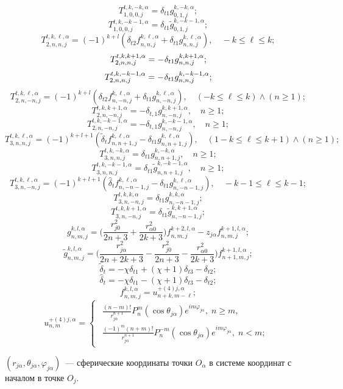 \begin{theorem}
\[T_{1,0,0,j}^{t,k, - k,\alpha } = {\delta _{t1}}{g}_{0,1,j}^{k, - k,\alpha };\]
\[T_{1,0,0,j}^{t,k, - k - 1,\alpha } = {\delta _{t1}}{\tilde g}_{0,1,j}^{k, - k - 1,\alpha };\]
\[T_{2,n,n,j}^{t,k,\ell ,\alpha } = (-1)^{k+l}({\delta _{t2}}{f}_{n,n,j}^{k,\ell ,\alpha } + {\delta _{t1}}{g}_{n,n,j}^{k,\ell ,\alpha }),\quad - k \le \ell  \le k;\]
\[T_{2,n,n,j}^{t,k,k+1,\alpha } =  - {\mkern 1mu} {\delta _{t1}}{g}_{n,n,j}^{k,k+1,\alpha };\]
\[T_{2,n,n,j}^{t,k, - k - 1,\alpha } =  - {\mkern 1mu} {\delta _{t1}}{g}_{n,n,j}^{k, - k - 1,\alpha };\]
\[T_{2,n, - n,j}^{t,k,\ell ,\alpha } = (-1)^{k+l}({\delta _{t2}}{f}_{n, - n,j}^{k,\ell ,\alpha } + {\delta _{t1}}{g}_{n, - n,j}^{k,\ell ,\alpha }),\quad (- k \le \ell  \le k) \wedge (n\ge 1);\]
\[T_{2,n, - n,j}^{t,k,k+1,\alpha } =  - {\delta _{t,1}}{g}_{n, - n,j}^{k,k + 1,\alpha },\quad n\ge 1;\]
\[T_{2,n, - n,j}^{t,k,-k-1,\alpha } =  - {\delta _{t,1}}{g}_{n, - n,j}^{k,-k-1,\alpha },\quad n\ge 1;\]
\[T_{3,n,n,j}^{t,k,\ell ,\alpha } = (-1)^{k+l+1}({\tilde \delta _t}{f}_{n,n + 1,j}^{k,\ell ,\alpha } - {\delta _{t1}}{g}_{n,n + 1,j}^{k,\ell ,\alpha }),\quad (1 - k \le \ell  \le k + 1) \wedge (n \ge 1);\]
\[T_{3,n,n,j}^{t,k, - k,\alpha } =  {\delta _{t1}}{g}_{n,n + 1,j}^{k, - k,\alpha },\quad n\ge 1;\]
\[T_{3,n,n,j}^{t,k, - k - 1,\alpha } = {\delta _{t1}}{\tilde g}_{n,n+1,j}^{k, - k - 1,\alpha },\quad n\ge 1;\]
\[T_{3,n, - n,j}^{t,k,\ell ,\alpha } = (-1)^{k+l+1}({\hat \delta _t}{f}_{n, - n - 1,j}^{k,\ell ,\alpha } - {\delta _{t1}}{g}_{n, - n - 1,j}^{k,\ell ,\alpha }),\quad - k - 1 \le \ell  \le k - 1;\]
\[T_{3,n, - n,j}^{t,k,k,\alpha } = {\delta _{t1}}{g}_{n, - n - 1,j}^{k,k,\alpha };\]
\[T_{3,n, - n,j}^{t,k,k + 1,\alpha } = {\delta _{t1}}{\tilde g}_{n,-n-1,j}^{k,k + 1,\alpha };\]
\[g_{n,m,j}^{k,l,\alpha}=\bigg(\frac{r_{j0}^2}{2n+3}+\frac{r_{\alpha 0}^2}{2k+3}\bigg)f_{n,m,j}^{k+2,l,\alpha}-z_{j\alpha}f_{n,m,j}^{k+1,l,\alpha};\]
\[{\tilde g}_{n,m,j}^{k,l,\alpha}=\bigg(\frac{r_{j\alpha}^2}{2n+2k+3}-\frac{r_{j0}^2}{2n+3}-\frac{r_{\alpha 0}^2}{2k+3}\bigg)f_{n+1,m,j}^{k+1,l,\alpha};\]
\[{\tilde \delta _t} =  - \chi {\delta _{t1}} + (\chi  + 1){\delta _{t3}} - {\delta _{t2}};\]
\[{\hat \delta _t} =  - \chi {\delta _{t1}} - (\chi  + 1){\delta _{t3}} - {\delta _{t2}};\]
\[{f}_{n,m,j}^{k,l,\alpha } = {u}_{n+k,m - \ell }^{ + (4)j,\alpha };\]
\[{{u}}_{n,m}^{ + (4)j,\alpha } = \left\{ {\begin{array}{*{20}{l}}
\begin{array}{l}
\frac{{(n - m)!}}{{r_{j\alpha }^{n + 1}}}P_n^m(\cos {\theta _{j\alpha }}){e^{im{\varphi _{j\alpha }}}},\;n \ge m,\\
\frac{{{{( - 1)}^m}(n + m)!}}{{r_{j\alpha }^{n + 1}}}P_n^{ - m}(\cos {\theta _{j\alpha }}){e^{im{\varphi _{j\alpha }}}},\;n < m;
\end{array}
\end{array}} \right.\]

\noindent $(r_{j\alpha},\theta_{j\alpha},\varphi_{j\alpha})$~--- сферические координаты точки $O_\alpha$ в системе координат с началом в точке $O_j$.
\end{theorem}


